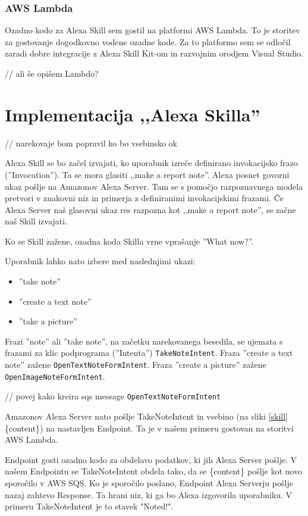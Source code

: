 \documentclass[a4paper, 12pt]{book}
\begin{document}
\subsubsection{AWS Lambda}

Ozadno kodo za Alexa Skill sem gostil na platformi AWS Lambda.
To je storitev za gostovanje dogodkovno vodene ozadne kode.
Za to platformo sem se odločil zaradi dobre integracije z Alexa Skill Kit-om in razvojnim orodjem Visual Studio.

// ali še opišem Lambdo?


\section{Implementacija ,,Alexa Skilla''}

// narekovaje bom popravil ko bo vsebinsko ok

Alexa Skill se bo začel izvajati, ko uporabnik izreče definirano invokacijsko frazo (''Invocation'').
Ta se mora glasiti ,,make a report note''.
Alexa posnet govorni ukaz pošlje na Amazonov Alexa Server.
Tam se s pomočjo razpoznavnega modela pretvori v znakovni niz in primerja z definiranimi invokacijskimi frazami.
Če Alexa Server naš glasovni ukaz res razpozna kot ,,make a report note'', se začne naš Skill izvajati.

Ko se Skill zažene, ozadna koda Skilla vrne vprašanje ''What now?''.

Uporabnik lahko nato izbere med naslednjimi ukazi:
\begin{itemize}
	\item ''take note''
	\item ''create a text note''
	\item ''take a picture''
\end{itemize}

Frazi ''note'' ali ''take note'', na začetku narekovanega besedila, se ujemata s frazami za klic podprograma (''Intenta'') \texttt{TakeNoteIntent}.
Fraza ''create a text note'' zažene \texttt{OpenTextNoteFormIntent}.
Fraza ''create a picture'' zažene \texttt{OpenImageNoteFormIntent}.

// povej kako kreira sqs message
\texttt{OpenTextNoteFormIntent} 


Amazonov Alexa Server nato pošlje TakeNoteIntent in vsebino (na sliki \ref{skill} \{content\}) na nastavljen Endpoint.
Ta je v našem primeru gostovan na storitvi AWS Lambda.

Endpoint gosti ozadno kodo za obdelavo podatkov, ki jih Alexa Server pošlje.
V našem Endpointu se TakeNoteIntent obdela tako, da se \{content\} pošlje kot novo sporočilo v AWS SQS.
Ko je sporočilo poslano, Endpoint Alexa Serverju pošlje nazaj zahtevo Response.
Ta hrani niz, ki ga bo Alexa izgovorila uporabniku.
V primeru TakeNoteIntent je to stavek "Noted!".
\end{document}
